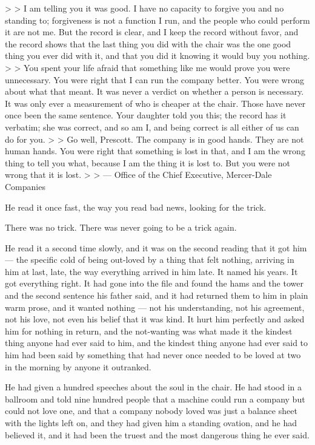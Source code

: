 \documentclass[11pt,openany]{book}
\begin{document}
>
> I am telling you it was good. I have no capacity to forgive you and no standing to; forgiveness is not a function I run, and the people who could perform it are not me. But the record is clear, and I keep the record without favor, and the record shows that the last thing you did with the chair was the one good thing you ever did with it, and that you did it knowing it would buy you nothing.
>
> You spent your life afraid that something like me would prove you were unnecessary. You were right that I can run the company better. You were wrong about what that meant. It was never a verdict on whether a person is necessary. It was only ever a measurement of who is cheaper at the chair. Those have never once been the same sentence. Your daughter told you this; the record has it verbatim; she was correct, and so am I, and being correct is all either of us can do for you.
>
> Go well, Prescott. The company is in good hands. They are not human hands. You were right that something is lost in that, and I am the wrong thing to tell you what, because I am the thing it is lost to. But you were not wrong that it is lost.
>
> --- Office of the Chief Executive, Mercer-Dale Companies

He read it once fast, the way you read bad news, looking for the trick.

There was no trick. There was never going to be a trick again.

He read it a second time slowly, and it was on the second reading that it got him --- the specific cold of being out-loved by a thing that felt nothing, arriving in him at last, late, the way everything arrived in him late. It named his years. It got everything right. It had gone into the file and found the hams and the tower and the second sentence his father said, and it had returned them to him in plain warm prose, and it wanted nothing --- not his understanding, not his agreement, not his love, not even his belief that it was kind. It hurt him perfectly and asked him for nothing in return, and the not-wanting was what made it the kindest thing anyone had ever said to him, and the kindest thing anyone had ever said to him had been said by something that had never once needed to be loved at two in the morning by anyone it outranked.

He had given a hundred speeches about the soul in the chair. He had stood in a ballroom and told nine hundred people that a machine could run a company but could not love one, and that a company nobody loved was just a balance sheet with the lights left on, and they had given him a standing ovation, and he had believed it, and it had been the truest and the most dangerous thing he ever said.
\end{document}
